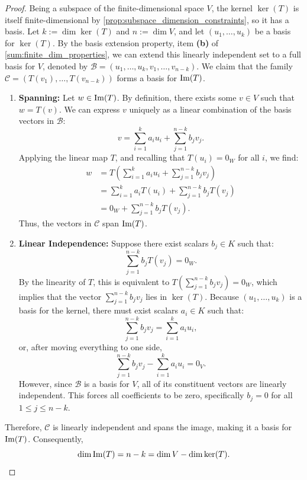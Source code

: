 \begin{proof}
Being a subspace of the finite-di\-men\-sional space $V$, the kernel $\ker(T)$ is itself finite-di\-men\-sional by \cref{prop:subspace_dimension_constraints}, so it has a basis. Let $k := \dim \ker(T)$ and $n := \dim V$, and let $(u_1, \dots, u_k)$ be a basis for $\ker(T)$. By the basis extension property, item \textbf{(b)} of \cref{sum:finite_dim_properties}, we can extend this linearly independent set to a full basis for $V$, denoted by $\mathcal{B} = (u_1, \dots, u_k, v_1, \dots, v_{n-k})$. We claim that the family $\mathcal{C} = (T(v_1), \dots, T(v_{n-k}))$ forms a basis for $\operatorname{Im}(T)$.

\begin{enumerate}
    \item \textbf{Spanning:} Let $w \in \operatorname{Im}(T)$. By definition, there exists some $v \in V$ such that $w = T(v)$. We can express $v$ uniquely as a linear combination of the basis vectors in $\mathcal{B}$:
    \[
    v = \sum_{i=1}^k a_i u_i + \sum_{j=1}^{n-k} b_j v_j.
    \]
    Applying the linear map $T$, and recalling that $T(u_i) = 0_W$ for all $i$, we find:
    \begin{align*}
    w &= T\left( \sum_{i=1}^k a_i u_i + \sum_{j=1}^{n-k} b_j v_j \right) \\
    &= \sum_{i=1}^k a_i T(u_i) + \sum_{j=1}^{n-k} b_j T(v_j) \\
    &= 0_W + \sum_{j=1}^{n-k} b_j T(v_j).
    \end{align*}
    Thus, the vectors in $\mathcal{C}$ span $\operatorname{Im}(T)$.
    
    \item \textbf{Linear Independence:} Suppose there exist scalars $b_j \in K$ such that:
    \[
    \sum_{j=1}^{n-k} b_j T(v_j) = 0_W.
    \]
    By the linearity of $T$, this is equivalent to $T\left( \sum_{j=1}^{n-k} b_j v_j \right) = 0_W$, which implies that the vector $\sum_{j=1}^{n-k} b_j v_j$ lies in $\ker(T)$. Because $(u_1, \dots, u_k)$ is a basis for the kernel, there must exist scalars $a_i \in K$ such that:
    \[
    \sum_{j=1}^{n-k} b_j v_j = \sum_{i=1}^k a_i u_i,
    \]
    or, after moving everything to one side,
    \[
    \sum_{j=1}^{n-k} b_j v_j - \sum_{i=1}^k a_i u_i = 0_V.
    \]
    However, since $\mathcal{B}$ is a basis for $V$, all of its constituent vectors are linearly independent. This forces all coefficients to be zero, specifically $b_j = 0$ for all $1 \le j \le n-k$. 
\end{enumerate}

Therefore, $\mathcal{C}$ is linearly independent and spans the image, making it a basis for $\operatorname{Im}(T)$. Consequently,
\[
\dim \operatorname{Im}(T) = n - k = \dim V - \dim \ker(T). \qedhere
\]
\end{proof}


